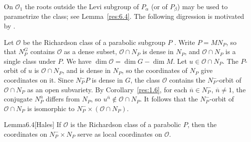 \documentclass[12pt,letterpaper]{amsart}
\theoremstyle{plain}
\theoremstyle{definition}
\theoremstyle{remark}
\theoremstyle{definition}
\begin{document}
On ${\mathcal O}_1$ the roots outside the Levi subgroup of $P_\alpha$ (or of
$P_\beta$) may be used to parametrize the class; see Lemma~\ref{res:6.4}.
The following digression is motivated by \cite[Remark~V.2.2]{Ha92a}.

Let ${\mathcal O}$ be the Richardson class of a parabolic subgroup $P$
\cite[\S3.9, Theorem~2]{St74}. Write $P=MN_P$, so that $N_P^G$
contains ${\mathcal O}$ as a dense subset, ${\mathcal O}\cap N_P$ is dense in
$N_P$, and ${\mathcal O}\cap N_P$ is a single class under $P$. We have
$\dim{\mathcal O} = \dim G - \dim M$. Let $u\in {\mathcal O}\cap N_P$. The
$P$-orbit of $u$ is ${\mathcal O}\cap N_P$, and is dense in $N_P$, so the
coordinates of $N_P$ give coordinates on it. Since $N_P^- P$ is dense in $G$,
the class ${\mathcal O}$ contains the $N_P^-$-orbit of ${\mathcal O}\cap N_P$
as an open subvariety. By Corollary~\ref{res:1.6}, for each
$\overline{n}\in N_P^-$, $\overline{n}\neq1$, the conjugate $N_P^{\overline n}$
differs from $N_P$, so $u^{\overline{n}}\notin {\mathcal O}\cap N_P$.
It follows that the $N_P^-$-orbit of ${\mathcal O}\cap N_P$
is isomorphic to $N_P^-\times({\mathcal O}\cap N_P)$.

\begin{res}{Lemma}{6.4}[Hales]\label{res:6.4}
If ${\mathcal O}$ is the Richardson class of a
parabolic $P$, then the coordinates on $N_P^- \times N_P$ serve as local
coordinates on ${\mathcal O}$.
\end{res}
\end{document}

